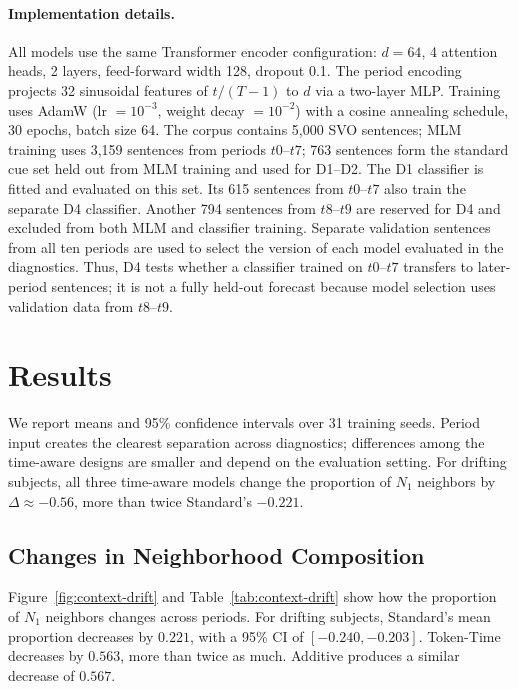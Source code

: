 \documentclass[runningheads]{llncs}
\begin{document}
\paragraph{Implementation details.}
All models use the same Transformer encoder configuration: \(d=64\), 4
attention heads, 2 layers, feed-forward width 128, dropout 0.1. The period
encoding projects 32 sinusoidal features of \(t/(T-1)\) to \(d\) via a
two-layer MLP. Training uses
AdamW (lr \(=10^{-3}\), weight decay \(=10^{-2}\)) with a cosine annealing
schedule, 30 epochs, batch size 64. The corpus contains 5{,}000 SVO sentences;
MLM training uses 3{,}159 sentences from periods \(t0\)--\(t7\); 763 sentences
form the standard cue set held out from MLM training and used for D1--D2.
The D1 classifier is fitted and evaluated on this set. Its 615 sentences from
\(t0\)--\(t7\) also train the separate D4 classifier. Another 794 sentences
from \(t8\)--\(t9\) are reserved for D4 and excluded from both MLM and
classifier training. Separate validation sentences from all ten periods are used to
select the version of each model evaluated in the diagnostics. Thus, D4 tests
whether a classifier trained on \(t0\)--\(t7\) transfers to later-period sentences; it
is not a fully held-out forecast because model selection uses validation data
from \(t8\)--\(t9\).

\section{Results}
We report means and 95\% confidence intervals over 31 training seeds. Period
input creates the clearest separation across diagnostics; differences among the
time-aware designs are smaller and depend on the evaluation setting. For
drifting subjects, all three time-aware models change the proportion of
\(N_1\) neighbors by \(\Delta\approx-0.56\), more than twice Standard's
\(-0.221\).

\subsection{Changes in Neighborhood Composition}
Figure~\ref{fig:context-drift} and Table~\ref{tab:context-drift} show how the
proportion of \(N_1\) neighbors changes across periods. For drifting subjects,
Standard's mean proportion decreases by \(0.221\), with a 95\% CI of
\([-0.240,-0.203]\). Token-Time decreases by \(0.563\), more than twice as
much. Additive produces a similar decrease of \(0.567\).
\end{document}
